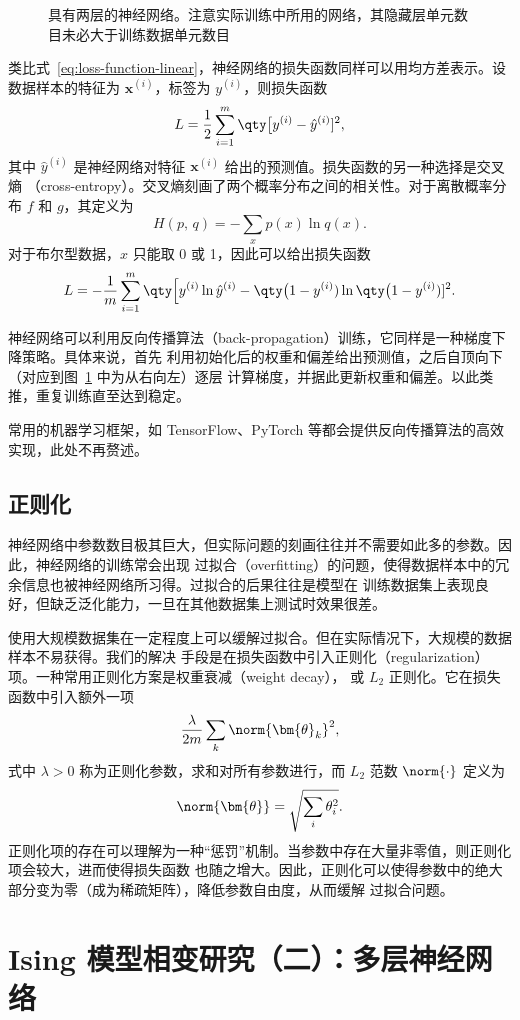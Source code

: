 \begin{figure}[htb]
  \centering
  \caption{具有两层的神经网络。注意实际训练中所用的网络，其隐藏层单元数目未必大于训练数据单元数目}
  \label{fig:neural-net}
\end{figure}

类比式~\eqref{eq:loss-function-linear}，神经网络的损失函数同样可以用均方差表示。设数据样本的特征为
$\bm{x}^{(i)}$，标签为 $y^{(i)}$，则损失函数
\begin{equation}
  L = \frac{1}{2} \sum_{i=1}^m \qty\big[y^{(i)} - \hat{y}^{(i)}]^2,
\end{equation}
其中 $\hat{y}^{(i)}$ 是神经网络对特征 $\bm{x}^{(i)}$ 给出的预测值。损失函数的另一种选择是交叉熵
（cross-entropy）。交叉熵刻画了两个概率分布之间的相关性。对于离散概率分布 $f$ 和 $g$，其定义为
\begin{equation}
  H(p,\,q) = - \sum_x p(x) \ln q(x).
\end{equation}
对于布尔型数据，$x$ 只能取 0 或 1，因此可以给出损失函数
\begin{equation}
  L = - \frac{1}{m} \sum_{i=1}^m
        \qty\Big[y^{(i)}\ln\hat{y}^{(i)} - \qty\big(1-y^{(i)})\ln\qty\big(1-y^{(i)})]^2.
\end{equation}

神经网络可以利用反向传播算法（back-propagation）训练，它同样是一种梯度下降策略。具体来说，首先
利用初始化后的权重和偏差给出预测值，之后自顶向下（对应到图~\ref{fig:neural-net} 中为从右向左）逐层
计算梯度，并据此更新权重和偏差。以此类推，重复训练直至达到稳定。

常用的机器学习框架，如 TensorFlow、PyTorch 等都会提供反向传播算法的高效实现，此处不再赘述。

\subsection{正则化}

神经网络中参数数目极其巨大，但实际问题的刻画往往并不需要如此多的参数。因此，神经网络的训练常会出现
过拟合（overfitting）的问题，使得数据样本中的冗余信息也被神经网络所习得。过拟合的后果往往是模型在
训练数据集上表现良好，但缺乏泛化能力，一旦在其他数据集上测试时效果很差。

使用大规模数据集在一定程度上可以缓解过拟合。但在实际情况下，大规模的数据样本不易获得。我们的解决
手段是在损失函数中引入正则化（regularization）项。一种常用正则化方案是权重衰减（weight decay），
或 $L_2$ 正则化。它在损失函数中引入额外一项
\begin{equation}
  \frac{\lambda}{2m} \sum_k \norm{\bm{\theta}_k}^2,
\end{equation}
式中 $\lambda>0$ 称为正则化参数，求和对所有参数进行，而 $L_2$ 范数 $\norm{\cdot}$ 定义为
\begin{equation}
  \norm{\bm{\theta}} = \sqrt{\sum_i \theta_i^2}.
\end{equation}
正则化项的存在可以理解为一种“惩罚”机制。当参数中存在大量非零值，则正则化项会较大，进而使得损失函数
也随之增大。因此，正则化可以使得参数中的绝大部分变为零（成为稀疏矩阵），降低参数自由度，从而缓解
过拟合问题。

\section{Ising 模型相变研究（二）：多层神经网络}
